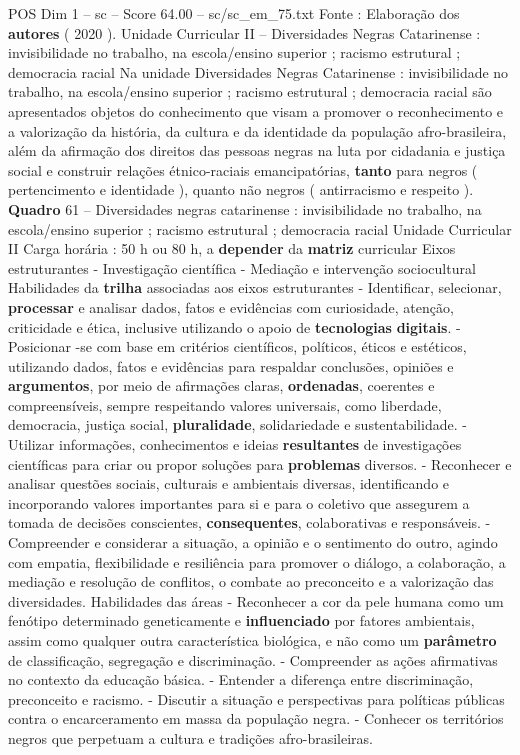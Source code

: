 \begin{textsample}{POS Dim 1 – sc – Score 64.00 – sc/sc\_em\_75.txt}
Fonte : Elaboração dos \textbf{autores} ( 2020 ).
Unidade Curricular II – Diversidades Negras Catarinense : invisibilidade no trabalho, na escola/ensino superior ; racismo estrutural ; democracia racial Na unidade Diversidades Negras Catarinense : invisibilidade no trabalho, na escola/ensino superior ; racismo estrutural ; democracia racial são apresentados objetos do conhecimento que visam a promover o reconhecimento e a valorização da história, da cultura e da identidade da população afro-brasileira, além da afirmação dos direitos das pessoas negras na luta por cidadania e justiça social e construir relações étnico-raciais emancipatórias, \textbf{tanto} para negros ( pertencimento e identidade ), quanto não negros ( antirracismo e respeito ). \textbf{Quadro} 61 – Diversidades negras catarinense : invisibilidade no trabalho, na escola/ensino superior ; racismo estrutural ; democracia racial Unidade Curricular II Carga horária : 50 h ou 80 h, a \textbf{depender} da \textbf{matriz} curricular Eixos estruturantes - Investigação científica - Mediação e intervenção sociocultural Habilidades da \textbf{trilha} associadas aos eixos estruturantes - Identificar, selecionar, \textbf{processar} e analisar dados, fatos e evidências com curiosidade, atenção, criticidade e ética, inclusive utilizando o apoio de \textbf{tecnologias} \textbf{digitais}. - Posicionar -se com base em critérios científicos, políticos, éticos e estéticos, utilizando dados, fatos e evidências para respaldar conclusões, opiniões e \textbf{argumentos}, por meio de afirmações claras, \textbf{ordenadas}, coerentes e compreensíveis, sempre respeitando valores universais, como liberdade, democracia, justiça social, \textbf{pluralidade}, solidariedade e sustentabilidade. - Utilizar informações, conhecimentos e ideias \textbf{resultantes} de investigações científicas para criar ou propor soluções para \textbf{problemas} diversos. - Reconhecer e analisar questões sociais, culturais e ambientais diversas, identificando e incorporando valores importantes para si e para o coletivo que assegurem a tomada de decisões conscientes, \textbf{consequentes}, colaborativas e responsáveis. - Compreender e considerar a situação, a opinião e o sentimento do outro, agindo com empatia, flexibilidade e resiliência para promover o diálogo, a colaboração, a mediação e resolução de conflitos, o combate ao preconceito e a valorização das diversidades.
Habilidades das áreas - Reconhecer a cor da pele humana como um fenótipo determinado geneticamente e \textbf{influenciado} por fatores ambientais, assim como qualquer outra característica biológica, e não como um \textbf{parâmetro} de classificação, segregação e discriminação. - Compreender as ações afirmativas no contexto da educação básica. - Entender a diferença entre discriminação, preconceito e racismo. - Discutir a situação e perspectivas para políticas públicas contra o encarceramento em massa da população negra. - Conhecer os territórios negros que perpetuam a cultura e tradições afro-brasileiras.

\end{textsample}
